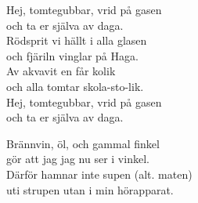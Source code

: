 \documentclass[a6paper,10pt]{article}
\begin{document}
\newpage
\setlength{\oddsidemargin}{-0.47in}
\noindent
\begin{center}
\end{center}
\begin{lyrics}
Hej, tomtegubbar, vrid på gasen \\
och ta er själva av daga. \\
Rödsprit vi hällt i alla glasen \\
och fjäriln vinglar på Haga. \\
Av akvavit en får kolik \\
och alla tomtar skola-sto-lik. \\
Hej, tomtegubbar, vrid på gasen \\
och ta er själva av daga. 
\end{lyrics}
\vspace{55pt}
\begin{center}
\end{center}
\begin{lyrics}
Brännvin, öl, och gammal finkel \\
gör att jag jag nu ser i vinkel. \\
Därför hamnar inte supen (alt. maten) \\
uti strupen utan i min hörapparat. \\
\end{lyrics}
\end{document}
